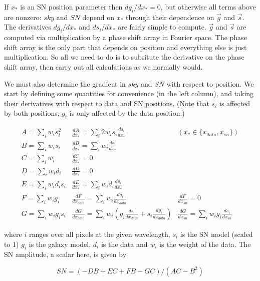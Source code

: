 \documentclass[12pt]{article}
\begin{document}
\noindent If $x_\ast$ is an SN position parameter then $dg_i/dx_\ast = 0$,
but otherwise all terms above are nonzero: $sky$ and $SN$
depend on $x_\ast$ through their dependence on $\vec{g}$ and
$\vec{s}$. The derivatives $dg_i/dx_\ast$ and $ds_i/dx_\ast$ are fairly
simple to compute. $\vec{g}$ and $\vec{s}$ are computed via
multiplication by a phase shift array in Fourier space. The phase
shift array is the only part that depends on position and everything
else is just multiplication. So all we need to do is to subsitute the
derivative on the phase shift array, then carry out all calculations
as we normally would.

We must also determine the gradient in $sky$ and $SN$ with respect to
position.  We start by defining some quantities for
convenience (in the left column), and taking their derivatives with respect to
data and SN positions. (Note that $s_i$ is affected by both positions, $g_i$ is only affected by the data position.)

\begin{displaymath}
\begin{array}{ccc}
A = \sum_i w_i s_i^2    & \frac{dA}{dx_\ast} = \sum_i 2 w_i s_i \frac{ds_i}{dx_\ast}   &   (x_\ast \in \{x_{data}, x_{sn}\}) \\
B = \sum_i w_i s_i    & \frac{dB}{dx_\ast} = \sum_i w_i \frac{ds_i}{dx_\ast} \\
C = \sum_i w_i         & \frac{dC}{dx_\ast} = 0 \\
D = \sum_i w_i d_i     & \frac{dD}{dx_\ast} = 0 \\%
E = \sum_i w_i d_i s_i  & \frac {dE}{dx_\ast} = \sum_i w_i d_i  \frac{ds_i}{dx_\ast} \\ %
F = \sum_i w_i g_i     & \frac{dF}{dx_{data}} = \sum_i w_i \frac{dg_i}{dx_{data}}   &    \frac{dF}{dx_{sn}} = 0 \\ %
G = \sum_i w_i g_i s_i  & \frac{dG}{dx_{data}} = \sum_i w_i \left(g_i \frac{ds_i}{dx_{data}} + s_i \frac{dg_i}{dx_{data}} \right) & \frac{dG}{dx_{sn}} = \sum_i w_i g_i \frac{ds_i}{dx_{sn}} %
\end{array}
\end{displaymath}

\noindent where $i$ ranges over all pixels at the given wavelength,
$s_i$ is the SN model (scaled to 1) $g_i$ is the galaxy model, $d_i$
is the data and $w_i$ is the weight of the data. The SN amplitude, a
scalar here, is given by

\begin{equation}
SN = (-DB + EC + FB - GC) / (AC - B^2)
\end{equation}
\end{document}
